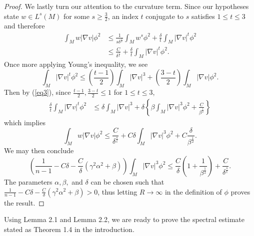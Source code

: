 \documentclass{amsart}
\theoremstyle{definition}
\theoremstyle{remark}
\numberwithin{equation}{section}
\begin{document}
\begin{proof}
We lastly turn our attention to the curvature term. Since our hypotheses state $w\in L^s(M)$ for some $s\geq\frac{3}{2}$, an index $t$ conjugate to $s$ satisfies $1\leq t\leq 3$ and therefore
\begin{align*}
\int_M w|\nabla v|\phi^2 &\leq \frac{1}{s\delta^\frac{s}{t}}\int_M w^s\phi^2+\frac{\delta}{t}\int_M |\nabla v|^t\phi^2\\
&\leq \frac{C}{\delta^\frac{s}{t}}+\frac{\delta}{t}\int_M|\nabla v|^t\phi^2.
\end{align*}
Once more applying Young's inequality, we see
\begin{equation*}
\int_M |\nabla v|^t\phi^2\leq \left(\frac{t-1}{2}\right)\int_M |\nabla v|^3+\left(\frac{3-t}{2}\right)\int_M|\nabla v|\phi^2.
\end{equation*}
Then by (\ref{eq3}), since $\frac{t-1}{2}, \frac{3-t}{2}\leq 1$ for $1\leq t\leq 3$,
\begin{align*}
\frac{\delta}{t}\int_M |\nabla v|^t\phi^2 &\leq \delta\int_M |\nabla v|^3+\delta\left\{\beta\int_M |\nabla v|^3\phi^2+\frac{C}{\beta^\frac{1}{2}}\right\}
\end{align*}
which implies
\begin{equation*}
\int_M w|\nabla v|\phi^2\leq \frac{C}{\delta^\frac{s}{t}} + C\delta \int_M|\nabla v|^3\phi^2 + C\frac{\delta}{\beta^\frac{1}{2}}.
\end{equation*}
We may then conclude
\begin{equation*}
\left(\frac{1}{n-1}-C\delta -\frac{C}{\delta}(\gamma^2\alpha^2+\beta)\right)\int_M|\nabla v|^3\phi^2\leq \frac{C}{\delta}\left(1+\frac{1}{\beta^\frac{1}{2}}\right)+\frac{C}{\delta^\frac{s}{t}}.
\end{equation*}
The parameters $\alpha,\beta,$ and $\delta$ can be chosen such that $\frac{1}{n-1}-C\delta -\frac{C}{\delta}(\gamma^2\alpha^2+\beta)>0$, thus letting $R\to\infty$ in the definition of $\phi$ proves the result.
\end{proof}

Using Lemma 2.1 and Lemma 2.2, we are ready to prove the spectral estimate stated as Theorem 1.4 in the introduction.
\end{document}
